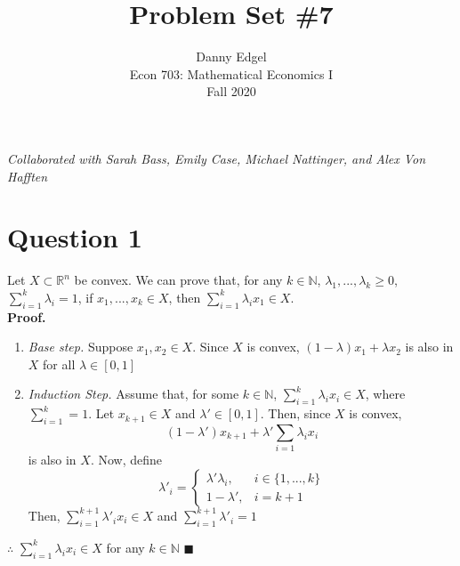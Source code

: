 \documentclass{article}
\newcommand{\N}{\mathbb{N}}
\newcommand{\R}{\mathbb{R}}
\begin{document}
\title{	Problem Set \#7 }
\author{ 	Danny Edgel 							\\ 
			Econ 703: Mathematical Economics I		\\
			Fall 2020								\\
		}
\maketitle\thispagestyle{empty}


\noindent\textit{Collaborated with Sarah Bass, Emily Case, Michael Nattinger, and Alex Von Hafften}


\section*{Question 1}
Let $X\subset\R^n$ be convex. We can prove that, for any $k\in\N$, $\lambda_1,...,\lambda_k\geq 0$, $\sum_{i=1}^k\lambda_i=1$, if ${x_1,...,x_k\in X}$, then ${\sum_{i=1}^k\lambda_ix_1\in X}$.
\medskip \\
\textbf{Proof.}
\begin{enumerate}
	\item \textit{Base step.} Suppose $x_1,x_2\in X$. Since $X$ is convex, $(1-\lambda)x_1 + \lambda x_2$ is also in $X$ for all $\lambda\in[0,1]$
	\item \textit{Induction Step.} Assume that, for some $k\in\N$, $\sum_{i=1}^k\lambda_ix_i\in X$, where $\sum_{i=1}^k=1$. Let $x_{k+1}\in X$ and $\lambda'\in[0,1]$. Then, since $X$ is convex, 
		\[
			(1-\lambda')x_{k+1} + \lambda'\sum_{i=1}\lambda_ix_i
		\]
		is also in $X$. Now, define
		\[
			{\lambda'}_i = \begin{cases} \lambda'\lambda_i, &i\in\{1,...,k\} \\ 1 - \lambda', &i=k+1 \end{cases}
		\]
		Then, $\sum_{i=1}^{k+1}{\lambda'}_ix_i\in X$ and $\sum_{i=1}^{k+1}{\lambda'}_i=1$
\end{enumerate}
$\therefore$ $\sum_{i=1}^k\lambda_ix_i\in X$ for any $k\in\N$ $\blacksquare$

	
\pagebreak
\end{document}
